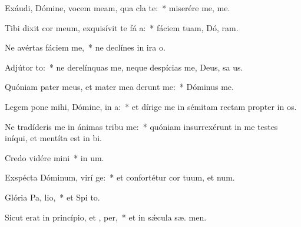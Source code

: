 \item Exáudi, Dómine, vocem meam, qua cla  te:~* miserére me,   me.
\item Tibi dixit cor meum, exquisívit te fá a:~* fáciem tuam, Dó, ram.
\item Ne avértas fáciem   me,~* ne declínes in ira   o.
\item Adjútor  to:~* ne derelínquas me, neque despícias me, Deus, sa us.
\item Quóniam pater meus, et mater mea derunt me:~* Dóminus   me.
\item Legem pone mihi, Dómine, in  a:~* et dírige me in sémitam rectam propter in os.
\item Ne tradíderis me in ánimas tribu me:~* quóniam insurrexérunt in me testes iníqui, et mentíta est in bi.
\item Credo vidére  mini~* in  um.
\item Exspécta Dóminum, virí ge:~* et confortétur cor tuum, et  num.
\item Glória Pa,  lio,~* et Spi to.
\item Sicut erat in princípio, et ,  per,~* et in sǽcula sæ. men.
